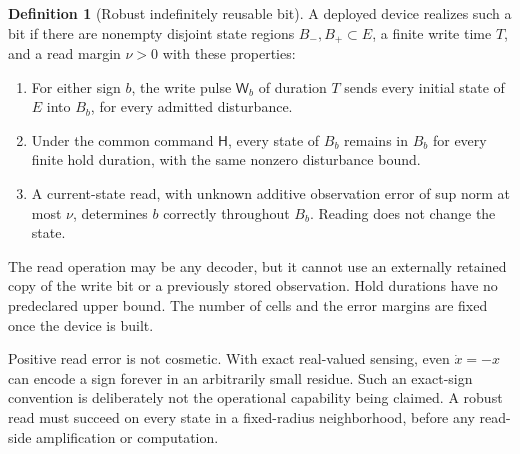 \documentclass[11pt]{article}
\theoremstyle{definition}
\newtheorem{definition}[theorem]{Definition}
\theoremstyle{remark}
\begin{document}
\begin{definition}[Robust indefinitely reusable bit]\label{fb:def:memory}
A deployed device realizes such a bit if there are nonempty disjoint state regions $B_-,B_+\subset E$, a finite write time $T$, and a read margin $\nu>0$ with these properties:
\begin{enumerate}
\item For either sign $b$, the write pulse $\mathsf W_b$ of duration $T$ sends every initial state of $E$ into $B_b$, for every admitted disturbance.
\item Under the common command $\mathsf H$, every state of $B_b$ remains in $B_b$ for every finite hold duration, with the same nonzero disturbance bound.
\item A current-state read, with unknown additive observation error of sup norm at most $\nu$, determines $b$ correctly throughout $B_b$. Reading does not change the state.
\end{enumerate}
The read operation may be any decoder, but it cannot use an externally retained copy of the write bit or a previously stored observation. Hold durations have no predeclared upper bound. The number of cells and the error margins are fixed once the device is built.
\end{definition}

Positive read error is not cosmetic. With exact real-valued sensing, even $\dot x=-x$ can encode a sign forever in an arbitrarily small residue. Such an exact-sign convention is deliberately not the operational capability being claimed. A robust read must succeed on every state in a fixed-radius neighborhood, before any read-side amplification or computation.
\end{document}
